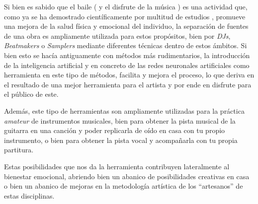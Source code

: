 Si bien es sabido que el baile ( y el disfrute de la música ) es una actividad que, como ya se ha demostrado científicamente por multitud de estudios \cite{musica-electronica}, promueve una mejora de la salud física  y emocional del individuo, la separación de fuentes de una obra es ampliamente utilizada para estos propósitos, bien por \textit{DJs}, \textit{Beatmakers} o \textit{Samplers} mediante diferentes técnicas dentro de estos ámbitos. Si bien esto se hacía antiguamente con métodos más rudimentarios, la introducción de la inteligencia artificial y en concreto de las redes neuronales artificiales como herramienta en este tipo de métodos, facilita y mejora el proceso, lo que deriva en el resultado de una mejor herramienta para el artista y por ende en disfrute para el público de este.

Además, este tipo de herramientas son ampliamente utilizadas para la práctica \textit{amateur} de instrumentos musicales, bien para obtener la pista musical de la guitarra en una canción y poder replicarla de oído en casa con tu propio instrumento, o bien para obtener la pista vocal y acompañarla con tu propia partitura.

Estas posibilidades que nos da la herramienta contribuyen lateralmente al bienestar emocional, abriendo bien un abanico de posibilidades creativas en casa o bien un abanico de mejoras en la metodología artística de los ``artesanos'' de estas disciplinas.